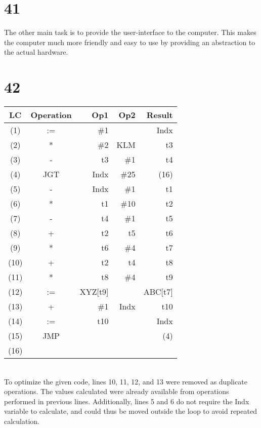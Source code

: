 \documentclass[a4paper,11pt]{article}
\begin{document}

\section*{41}
The other main task is to provide the user-interface to the computer.  This makes the computer much more friendly and easy to use by providing an abstraction to the actual hardware.  


\section*{42}
\begin{tabular}{ | c | c | r | r | r |}
  \hline
    LC & Operation & Op1 & Op2 & Result  \\ \hline
    (1) & := & \#1 &  & Indx \\ \hline
    (2) & * & \#2 & KLM & t3 \\ \hline
    (3) & - & t3 & \#1 & t4 \\ \hline
    (4) & JGT & Indx & \#25 & (16) \\ \hline
    (5) & - & Indx & \#1 & t1 \\ \hline
    (6) & * & t1 & \#10 & t2 \\ \hline
    (7) & - & t4 & \#1 & t5 \\ \hline
    (8) & + & t2 & t5 & t6 \\ \hline
    (9) & * & t6 & \#4 & t7 \\ \hline
    (10) & + & t2 & t4 & t8 \\ \hline
    (11) & * & t8 & \#4 & t9 \\ \hline
    (12) & := & XYZ[t9] &  & ABC[t7] \\ \hline
    (13) & + & \#1 & Indx & t10 \\ \hline
    (14) & := & t10 &   & Indx \\ \hline
    (15) & JMP &  &   & (4) \\ \hline
    (16) &   &    &    &    \\ \hline
\end{tabular} \\

To optimize the given code, lines 10, 11, 12, and 13 were removed as duplicate operations.  The values calculated were already available from operations performed in previous lines.  Additionally, lines 5 and 6 do not require the Indx variable to calculate, and could thus be moved outside the loop to avoid repeated calculation.  
\end{document}

